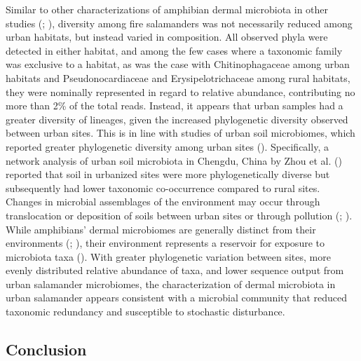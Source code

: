 \documentclass[
  12pt,
]{article}
\begin{document}
Similar to other characterizations of amphibian dermal microbiota in
other studies (;
), diversity among
fire salamanders was not necessarily reduced among urban habitats, but
instead varied in composition. All observed phyla were detected in
either habitat, and among the few cases where a taxonomic family was
exclusive to a habitat, as was the case with Chitinophagaceae among
urban habitats and Pseudonocardiaceae and Erysipelotrichaceae among
rural habitats, they were nominally represented in regard to relative
abundance, contributing no more than 2\% of the total reads. Instead, it
appears that urban samples had a greater diversity of lineages, given
the increased phylogenetic diversity observed between urban sites. This
is in line with studies of urban soil microbiomes, which reported
greater phylogenetic diversity among urban sites
(). Specifically, a network analysis of urban soil microbiota in
Chengdu, China by Zhou et al.
() reported that soil in
urbanized sites were more phylogenetically diverse but subsequently had
lower taxonomic co-occurrence compared to rural sites. Changes in
microbial assemblages of the environment may occur through translocation
or deposition of soils between urban sites or through pollution
(;
). While amphibians' dermal microbiomes are generally distinct from
their environments (; ), their
environment represents a reservoir for exposure to microbiota taxa
(). With greater
phylogenetic variation between sites, more evenly distributed relative
abundance of taxa, and lower sequence output from urban salamander
microbiomes, the characterization of dermal microbiota in urban
salamander appears consistent with a microbial community that reduced
taxonomic redundancy and susceptible to stochastic disturbance.

\subsection{Conclusion}\label{conclusion}
\end{document}
